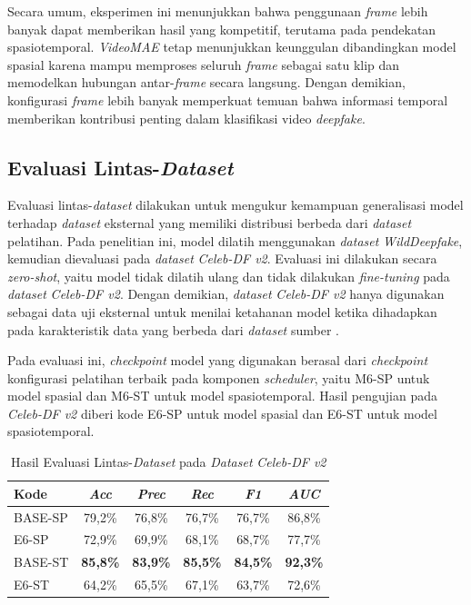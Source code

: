 Secara umum, eksperimen ini menunjukkan bahwa penggunaan \textit{frame} lebih banyak dapat memberikan hasil yang kompetitif, terutama pada pendekatan spasiotemporal. \textit{VideoMAE} tetap menunjukkan keunggulan dibandingkan model spasial karena mampu memproses seluruh \textit{frame} sebagai satu klip dan memodelkan hubungan antar-\textit{frame} secara langsung. Dengan demikian, konfigurasi \textit{frame} lebih banyak memperkuat temuan bahwa informasi temporal memberikan kontribusi penting dalam klasifikasi video \textit{deepfake}.

\subsection{Evaluasi Lintas-\textit{Dataset}} \label{IV.Evaluasi_Lintas_Dataset}

Evaluasi lintas-\textit{dataset} dilakukan untuk mengukur kemampuan generalisasi model terhadap \textit{dataset} eksternal yang memiliki distribusi berbeda dari \textit{dataset} pelatihan. Pada penelitian ini, model dilatih menggunakan \textit{dataset} \textit{WildDeepfake}, kemudian dievaluasi pada \textit{dataset} \textit{Celeb-DF v2}. Evaluasi ini dilakukan secara \textit{zero-shot}, yaitu model tidak dilatih ulang dan tidak dilakukan \textit{fine-tuning} pada \textit{dataset} \textit{Celeb-DF v2}. Dengan demikian, \textit{dataset} \textit{Celeb-DF v2} hanya digunakan sebagai data uji eksternal untuk menilai ketahanan model ketika dihadapkan pada karakteristik data yang berbeda dari \textit{dataset} sumber \cite{Zi2024}\cite{li2020celebdflargescalechallengingdataset}.

Pada evaluasi ini, \textit{checkpoint} model yang digunakan berasal dari \textit{checkpoint} konfigurasi pelatihan terbaik pada komponen \textit{scheduler}, yaitu M6-SP untuk model spasial dan M6-ST untuk model spasiotemporal. Hasil pengujian pada \textit{Celeb-DF v2} diberi kode E6-SP untuk model spasial dan E6-ST untuk model spasiotemporal.

\begin{table}[htbp]
\centering
\caption{Hasil Evaluasi Lintas-\textit{Dataset} pada \textit{Dataset} \textit{Celeb-DF v2}}
\label{table:4.cross-dataset}
\begin{tabular}{lccccc}
\toprule
\textbf{Kode} &
\textbf{\textit{Acc}} &
\textbf{\textit{Prec}} &
\textbf{\textit{Rec}} &
\textbf{\textit{F1}} &
\textbf{\textit{AUC}} \\
\midrule
BASE-SP & 79,2\% & 76,8\% & 76,7\% & 76,7\% & 86,8\% \\
E6-SP & 72,9\% & 69,9\% & 68,1\% & 68,7\% & 77,7\% \\
\midrule
BASE-ST & \textbf{85,8\%} & \textbf{83,9\%} & \textbf{85,5\%} & \textbf{84,5\%} & \textbf{92,3\%} \\
E6-ST & 64,2\% & 65,5\% & 67,1\% & 63,7\% & 72,6\% \\
\bottomrule
\end{tabular}
\end{table}


